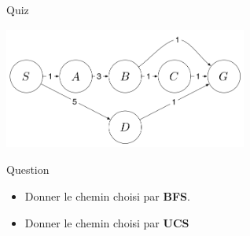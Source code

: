 \documentclass{beamer}
\begin{document}
\begin{frame}[t]{Quiz}
  \begin{center}
    \includegraphics[width=8cm,height=4cm]{./images/ucs_quiz.png}
  \end{center}

\begin{block}{Question}
  \begin{itemize}
    \item Donner le chemin  choisi par \textbf{BFS}.
    \item Donner le chemin choisi par \textbf{UCS} 
  \end{itemize}
\end{block}
\end{frame}
\end{document}

